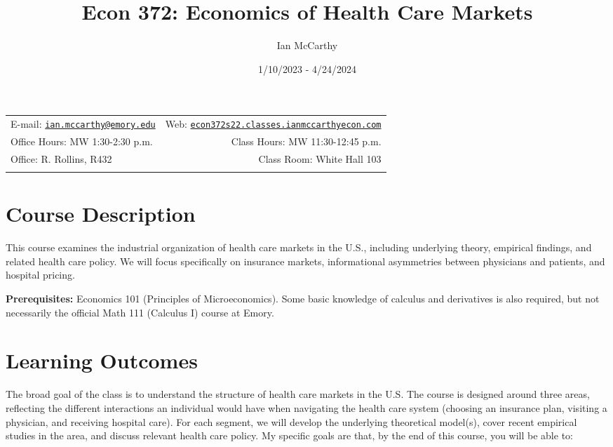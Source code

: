 \documentclass[11pt,]{article}
\title{Econ 372: Economics of Health Care Markets}
\author{Ian McCarthy}
\date{1/10/2023 - 4/24/2024}
\begin{document}
  

		\maketitle
		
	
		\thispagestyle{firststyle}



	\noindent \begin{tabular*}{\textwidth}{ @{\extracolsep{\fill}} lr @{\extracolsep{\fill}}}


E-mail: \texttt{\href{mailto:ian.mccarthy@emory.edu}{\nolinkurl{ian.mccarthy@emory.edu}}} & Web: \href{http://econ372s22.classes.ianmccarthyecon.com}{\tt econ372s22.classes.ianmccarthyecon.com}\\
Office Hours: MW 1:30-2:30 p.m.  &  Class Hours: MW 11:30-12:45 p.m.\\
Office: R. Rollins, R432  & Class Room: White Hall 103\\
	&  \\
	\hline
	\end{tabular*}
	
\vspace{2mm}
	


\hypertarget{course-description}{%
\section{Course Description}\label{course-description}}

This course examines the industrial organization of health care markets
in the U.S., including underlying theory, empirical findings, and
related health care policy. We will focus specifically on insurance
markets, informational asymmetries between physicians and patients, and
hospital pricing.

\textbf{Prerequisites:} Economics 101 (Principles of Microeconomics).
Some basic knowledge of calculus and derivatives is also required, but
not necessarily the official Math 111 (Calculus I) course at Emory.

\hypertarget{learning-outcomes}{%
\section{Learning Outcomes}\label{learning-outcomes}}

The broad goal of the class is to understand the structure of health
care markets in the U.S. The course is designed around three areas,
reflecting the different interactions an individual would have when
navigating the health care system (choosing an insurance plan, visiting
a physician, and receiving hospital care). For each segment, we will
develop the underlying theoretical model(s), cover recent empirical
studies in the area, and discuss relevant health care policy. My
specific goals are that, by the end of this course, you will be able to:
\end{document}
